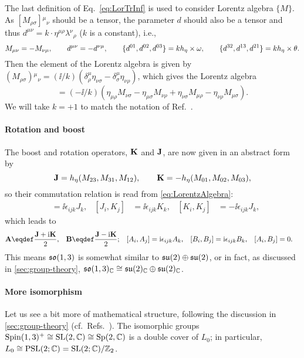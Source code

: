 \documentclass[CheatSheet]{subfiles}
\begin{document}
The last definition of Eq.~\eqref{eq:LorTrInf} is used to consider Lorentz algebra $\{M\}$.
As $[M_{\rho\sigma}]{}^\mu{}_\nu$ should be a tensor, the parameter $d$ should also be a tensor and thus $d^{\mu\nu}=k\cdot\eta^{\mu\rho}\lambda{}^\nu{}_\rho$ ($k$ is a constant), i.e.,
\begin{equation}
 M_{\mu\nu}=-M_{\nu\mu}, \qquad
 d^{\mu\nu}=-d^{\nu\mu}, \qquad
 \{d^{01},d^{02},d^{03}\}=kh_\eta\times{\mathbf{\omega}},\qquad
 \{d^{32},d^{13},d^{21}\}=kh_\eta\times{\mathbf{\theta}}.
\end{equation}
Then the element of the Lorentz algebra is given by
$ (M_{\rho\sigma}){}^\mu{}_\nu=
(\ii/k)(\delta^\mu_\rho\eta_{\nu\sigma}-\delta^\mu_\sigma \eta_{\nu\rho})
$, which gives the Lorentz algebra
\begin{equation}
[M_{\mu\nu},M_{\rho\sigma}] = 
(-\ii/k)\left(\eta_{\mu\rho}M_{\nu\sigma}-\eta_{\mu\sigma}M_{\nu\rho}
+\eta_{\nu\sigma}M_{\mu\rho}-\eta_{\nu\rho}M_{\mu\sigma}
\right).
\label{eq:LorentzAlgebra}
\end{equation}
We will take $k=+1$ to match the notation of Ref.~\cite{Kugo1}.

\paragraph{Rotation and boost}
The boost and rotation operators, ${\mathbf{K}}$ and ${\mathbf{J}}$, are now given in an abstract form by
\begin{equation}
 {\mathbf{J}} = h_\eta (M_{23}, M_{31}, M_{12}), \qquad
 {\mathbf{K}} = -h_\eta(M_{01}, M_{02}, M_{03}),
\end{equation}
so their commutation relation is read from \cref{eq:LorentzAlgebra}:
\begin{align}
 [J_i, J_j] &= \ii \epsilon_{ijk}J_k,&
 [J_i, K_j] &= \ii \epsilon_{ijk}K_k,&
 [K_i, K_j] &= -\ii \epsilon_{ijk}J_k,
\end{align}
which leads to
\begin{align}
 \vc A&\eqdef\frac{\vc J+\ii \vc K}{2},&
 \vc B&\eqdef\frac{\vc J-\ii \vc K}{2};&
 [A_i, A_j] &= \ii \epsilon_{ijk}A_k,&
 [B_i, B_j] &= \ii \epsilon_{ijk}B_k,&
 [A_i, B_j] &= 0.
\end{align}
This means $\operatorname{\mathfrak{so}}(1,3)$ is somewhat similar to $\operatorname{\mathfrak{su}}(2)\oplus \operatorname{\mathfrak{su}}(2)$, or in fact,
as discussed in \cref{sec:group-theory},
$\operatorname{\mathfrak{so}}(1,3)_{\mathbb C}\cong \operatorname{\mathfrak{su}}(2)_{\mathbb C}\oplus\operatorname{\mathfrak{su}}(2)_{\mathbb C}$.

\paragraph{More isomorphism}
Let us see a bit more of  mathematical structure, following the discussion in \cref{sec:group-theory} (cf.~Refs.~\cite{RauschdeTraubenberg:2005aa,Yamaguchi:spinor}).
The isomorphic groups
$\mathop{\mathrm{Spin}}(1,3)^+\cong\operatorname{\mathrm SL}(2,\mathbb C)\cong\operatorname{\mathrm Sp}(2,\mathbb C)$
is a double cover of $L_0$;
in particular, $L_0\cong \mathop{\mathrm{PSL}}(2;\mathbb C)=\operatorname{\mathrm SL}(2;\mathbb C)/\mathbb Z_2$.
\end{document}
